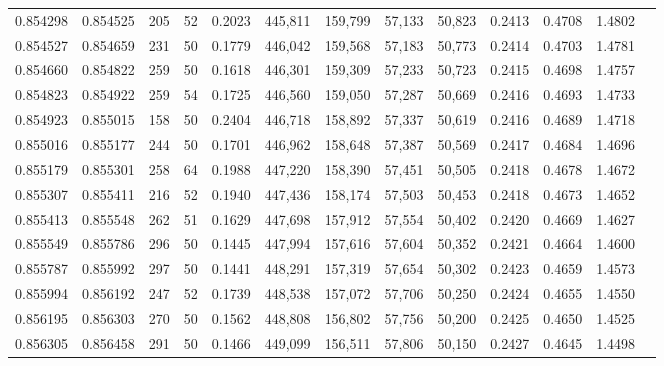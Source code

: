 \begin{tabular}{rrrrrrrrrrrrr}
0.854298 & 0.854525 &   205 &  52 &                                     0.2023 & 445,811 & 159,799 &  57,133 &  50,823 & 0.2413 & 0.4708 & 1.4802 \\
0.854527 & 0.854659 &   231 &  50 &                                     0.1779 & 446,042 & 159,568 &  57,183 &  50,773 & 0.2414 & 0.4703 & 1.4781 \\
0.854660 & 0.854822 &   259 &  50 &                                     0.1618 & 446,301 & 159,309 &  57,233 &  50,723 & 0.2415 & 0.4698 & 1.4757 \\
0.854823 & 0.854922 &   259 &  54 &                                     0.1725 & 446,560 & 159,050 &  57,287 &  50,669 & 0.2416 & 0.4693 & 1.4733 \\
0.854923 & 0.855015 &   158 &  50 &                                     0.2404 & 446,718 & 158,892 &  57,337 &  50,619 & 0.2416 & 0.4689 & 1.4718 \\
0.855016 & 0.855177 &   244 &  50 &                                     0.1701 & 446,962 & 158,648 &  57,387 &  50,569 & 0.2417 & 0.4684 & 1.4696 \\
0.855179 & 0.855301 &   258 &  64 &                                     0.1988 & 447,220 & 158,390 &  57,451 &  50,505 & 0.2418 & 0.4678 & 1.4672 \\
0.855307 & 0.855411 &   216 &  52 &                                     0.1940 & 447,436 & 158,174 &  57,503 &  50,453 & 0.2418 & 0.4673 & 1.4652 \\
0.855413 & 0.855548 &   262 &  51 &                                     0.1629 & 447,698 & 157,912 &  57,554 &  50,402 & 0.2420 & 0.4669 & 1.4627 \\
0.855549 & 0.855786 &   296 &  50 &                                     0.1445 & 447,994 & 157,616 &  57,604 &  50,352 & 0.2421 & 0.4664 & 1.4600 \\
0.855787 & 0.855992 &   297 &  50 &                                     0.1441 & 448,291 & 157,319 &  57,654 &  50,302 & 0.2423 & 0.4659 & 1.4573 \\
0.855994 & 0.856192 &   247 &  52 &                                     0.1739 & 448,538 & 157,072 &  57,706 &  50,250 & 0.2424 & 0.4655 & 1.4550 \\
0.856195 & 0.856303 &   270 &  50 &                                     0.1562 & 448,808 & 156,802 &  57,756 &  50,200 & 0.2425 & 0.4650 & 1.4525 \\
0.856305 & 0.856458 &   291 &  50 &                                     0.1466 & 449,099 & 156,511 &  57,806 &  50,150 & 0.2427 & 0.4645 & 1.4498 \\

\end{tabular}
